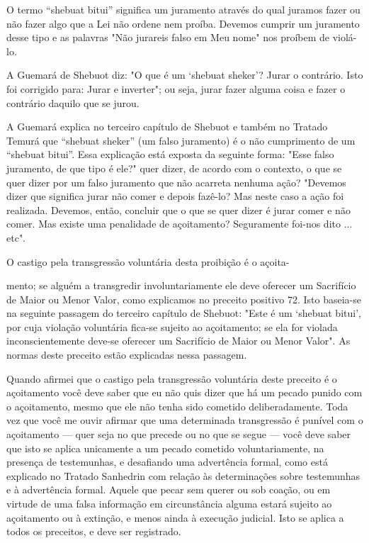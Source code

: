 O termo ``shebuat bitui'' significa um juramento através do qual ju­ramos
fazer ou não fazer algo que a Lei não ordene nem proíba. Devemos
cum­prir um juramento desse tipo e as palavras "Não jurareis falso em
Meu nome" nos proíbem de violá-lo.

A Guemará de Shebuot diz: "O que é um `shebuat sheker'? Jurar o
contrário. Isto foi corrigido para: Jurar e inverter"; ou seja, jurar
fazer alguma coisa e fazer o contrário daquilo que se jurou.

A Guemará explica no terceiro capítulo de Shebuot e também no Tra­tado
Temurá que ``shebuat sheker'' (um falso juramento) é o não cumprimento de
um ``shebuat bitui''. Essa explicação está exposta da seguinte forma:
"Esse falso juramento, de que tipo é ele?" quer dizer, de acordo com o
contexto, o que se quer dizer por um falso juramento que não acarreta
nenhuma ação? "Devemos dizer que significa jurar não comer e depois
fazê-lo? Mas neste caso a ação foi realizada. Devemos, então, concluir
que o que se quer dizer é jurar comer e não comer. Mas existe uma
penalidade de açoitamento? Seguramente foi-nos dito ... etc".


O castigo pela transgressão voluntária desta proibição é o açoita-


mento; se alguém a transgredir involuntariamente ele deve oferecer um
Sacrifí­cio de Maior ou Menor Valor, como explicamos no preceito
positivo 72. Isto baseia-se na seguinte passagem do terceiro capítulo de
Shebuot: "Este é um `she­buat bitui', por cuja violação voluntária
fica-se sujeito ao açoitamento; se ela for violada inconscientemente
deve-se oferecer um Sacrifício de Maior ou Me­nor Valor". As normas
deste preceito estão explicadas nessa passagem.

Quando afirmei que o castigo pela transgressão voluntária deste
pre­ceito é o açoitamento você deve saber que eu não quis dizer que há
um pecado punido com o açoitamento, mesmo que ele não tenha sido
cometido delibera­damente. Toda vez que você me ouvir afirmar que uma
determinada transgres­são é punível com o açoitamento --- quer seja no
que precede ou no que se segue --- você deve saber que isto se aplica
unicamente a um pecado cometido voluntariamente, na presença de
testemunhas, e desafiando uma advertência formal, como está explicado no
Tratado Sanhedrin com relação às determina­ções sobre testemunhas e à
advertência formal. Aquele que pecar sem querer ou sob coação, ou em
virtude de uma falsa informação em circunstância algu­ma estará sujeito
ao açoitamento ou à extinção, e menos ainda à execução judi­cial. Isto
se aplica a todos os preceitos, e deve ser registrado.

